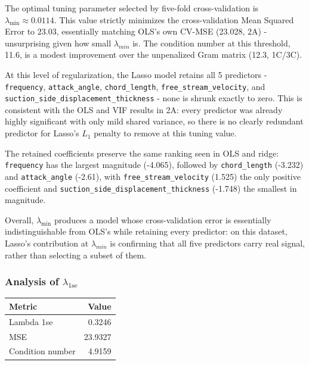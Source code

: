 \documentclass[
  11pt,
]{article}
\newcounter{none} %
\begin{document}
The optimal tuning parameter selected by five-fold cross-validation is
\(\lambda_{\text{min}} \approx 0.0114\). This value strictly minimizes
the cross-validation Mean Squared Error to \(23.03\), essentially
matching OLS's own CV-MSE (23.028, 2A) - unsurprising given how small
\(\lambda_{min}\) is. The condition number at this threshold, 11.6, is a
modest improvement over the unpenalized Gram matrix (12.3, 1C/3C).

At this level of regularization, the Lasso model retains all 5
predictors - \texttt{frequency}, \texttt{attack\_angle},
\texttt{chord\_length}, \texttt{free\_stream\_velocity}, and
\texttt{suction\_side\_displacement\_thickness} - none is shrunk exactly
to zero. This is consistent with the OLS and VIF results in 2A: every
predictor was already highly significant with only mild shared variance,
so there is no clearly redundant predictor for Lasso's \(L_1\) penalty
to remove at this tuning value.

The retained coefficients preserve the same ranking seen in OLS and
ridge: \texttt{frequency} has the largest magnitude (-4.065), followed
by \texttt{chord\_length} (-3.232) and \texttt{attack\_angle} (-2.61),
with \texttt{free\_stream\_velocity} (1.525) the only positive
coefficient and \texttt{suction\_side\_displacement\_thickness} (-1.748)
the smallest in magnitude.

Overall, \(\lambda_{\text{min}}\) produces a model whose
cross-validation error is essentially indistinguishable from OLS's while
retaining every predictor: on this dataset, Lasso's contribution at
\(\lambda_{min}\) is confirming that all five predictors carry real
signal, rather than selecting a subset of them.

\subsubsection{\texorpdfstring{Analysis of
\(\lambda_{\text{1se}}\)}{Analysis of \textbackslash lambda\_\{\textbackslash text\{1se\}\}}}\label{analysis-of-lambda_text1se}

{\def\LTcaptype{none} %
\begin{longtable}[]{@{}lr@{}}
\toprule\noalign{}
Metric & Value \\
\midrule\noalign{}
\endhead
\bottomrule\noalign{}
\endlastfoot
Lambda 1se & 0.3246 \\
MSE & 23.9327 \\
Condition number & 4.9159 \\
\end{longtable}
}
\end{document}
